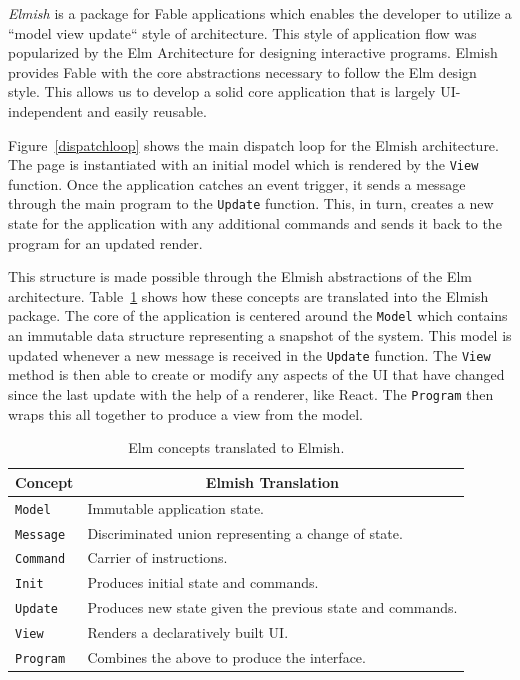 \documentclass[sigconf]{acmart}
\begin{document}
\textit{Elmish} is a package for Fable applications which enables the developer to utilize a ``model view update`` style of architecture. This style of application flow was popularized by the Elm Architecture for designing interactive programs. Elmish provides Fable with the core abstractions necessary to follow the Elm design style. This allows us to develop a solid core application that is largely UI-independent and easily reusable. 

Figure~\ref{dispatchloop} shows the main dispatch loop for the Elmish architecture. The page is instantiated with an initial model which is rendered by the \texttt{View} function. Once the application catches an event trigger, it sends a message through the main program to the \texttt{Update} function. This, in turn, creates a new state for the application with any additional commands and sends it back to the program for an updated render.

This structure is made possible through the Elmish abstractions of the Elm architecture. Table~\ref{tab:translate} shows how these concepts are translated into the Elmish package. The core of the application is centered around the \texttt{Model} which contains an immutable data structure representing a snapshot of the system. This model is updated whenever a new message is received in the \texttt{Update} function. The \texttt{View} method is then able to create or modify any aspects of the \textsc{UI} that have changed since the last update with the help of a renderer, like React. The \texttt{Program} then wraps this all together to produce a view from the model.

\begin{table}
  \caption{Elm concepts translated to Elmish.}
  \begin{tabular}{p{1cm}p{6cm}}
    \toprule
    \multicolumn{1}{c}{\textbf{Concept}} &
    \multicolumn{1}{c}{\textbf{Elmish Translation}} \\
    \midrule
     \verb|Model|&Immutable application state.\\
     \verb|Message|&Discriminated union representing a change of state.\\
	 \verb|Command|&Carrier of instructions.\\
     \verb|Init|&Produces initial state and commands.\\
     \verb|Update|&Produces new state given the previous state and commands.\\
     \verb|View|&Renders a declaratively built \textsc{UI}.\\
     \verb|Program|&Combines the above to produce the interface.\\
  \bottomrule
\end{tabular}
\label{tab:translate}
\end{table}
\end{document}
